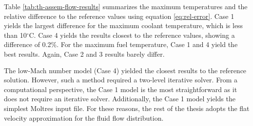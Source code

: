 Table \ref{tab:th-assem-flow-results} summarizes the maximum temperatures and the relative difference to the reference values using equation \ref{eq:rel-error}.
Case 1 yields the largest difference for the maximum coolant temperature, which is less than 10$^{\circ}$C.
Case 4 yields the results closest to the reference values, showing a difference of 0.2\%.
For the maximum fuel temperature, Case 1 and 4 yield the best results.
Again, Case 2 and 3 results barely differ.

The low-Mach number model (Case 4) yielded the closest results to the reference solution.
However, such a method required a two-level iterative solver.
From a computational perspective, the Case 1 model is the most straightforward as it does not require an iterative solver.
Additionally, the Case 1 model yields the simplest Moltres input file.
For these reasons, the rest of the thesis adopts the flat velocity approximation for the fluid flow distribution.

